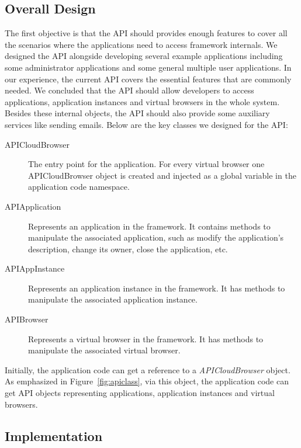 \subsection{Overall Design}

The first objective is that the API should provides enough features to cover
all the scenarios where the applications need to access framework internals.
We designed the API alongside developing several example applications
including some administrator applications and some general multiple user
applications. In our experience, the current API covers the essential features
that are commonly needed. We concluded that the API should allow developers to
access applications, application instances and virtual browsers in the whole
system. Besides these internal objects, the API should also provide some
auxiliary services like sending emails. Below are the key classes we designed
for the API:

\begin{description}
\item[APICloudBrowser]
The entry point for the application.
For every virtual browser one APICloudBrowser object is created and injected as
a global variable in the application code namespace.

\item[APIApplication] Represents an application in the framework.
It contains methods to manipulate the associated application, such as modify the application's
description, change its owner, close the application, etc.

\item[APIAppInstance] Represents an application instance in the framework.
It has methods to manipulate the associated application instance.

\item[APIBrowser] Represents a virtual browser in the framework.
It has methods to manipulate the associated virtual browser.

\end{description}

\apiclassfig{}

Initially, the application code can get a reference to a
\emph{APICloudBrowser} object. As emphasized in
Figure~\ref{fig:apiclass}, via this object, the application code can get API
objects representing applications, application instances and virtual browsers.


\subsection{Implementation}

